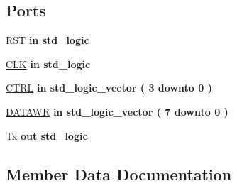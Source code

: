 \subsection*{Ports}
 \begin{DoxyCompactItemize}
\item 
\hyperlink{class_right_shft_a98682ef7de2714e5bab788a2e2ff1b7f}{R\+S\+T}  {\bfseries {\bfseries \textcolor{keywordflow}{in}\textcolor{vhdlchar}{ }}} {\bfseries \textcolor{comment}{std\+\_\+logic}\textcolor{vhdlchar}{ }} 
\item 
\hyperlink{class_right_shft_ab5d0ea9e968d49d94da9db07a979d402}{C\+L\+K}  {\bfseries {\bfseries \textcolor{keywordflow}{in}\textcolor{vhdlchar}{ }}} {\bfseries \textcolor{comment}{std\+\_\+logic}\textcolor{vhdlchar}{ }} 
\item 
\hyperlink{class_right_shft_a391405efff6be710026e84afd96734c7}{C\+T\+R\+L}  {\bfseries {\bfseries \textcolor{keywordflow}{in}\textcolor{vhdlchar}{ }}} {\bfseries \textcolor{comment}{std\+\_\+logic\+\_\+vector}\textcolor{vhdlchar}{ }\textcolor{vhdlchar}{(}\textcolor{vhdlchar}{ }\textcolor{vhdlchar}{ } \textcolor{vhdldigit}{3} \textcolor{vhdlchar}{ }\textcolor{keywordflow}{downto}\textcolor{vhdlchar}{ }\textcolor{vhdlchar}{ } \textcolor{vhdldigit}{0} \textcolor{vhdlchar}{ }\textcolor{vhdlchar}{)}\textcolor{vhdlchar}{ }} 
\item 
\hyperlink{class_right_shft_a7671d0cfbe49b836aa8bfd98c0477dfa}{D\+A\+T\+A\+W\+R}  {\bfseries {\bfseries \textcolor{keywordflow}{in}\textcolor{vhdlchar}{ }}} {\bfseries \textcolor{comment}{std\+\_\+logic\+\_\+vector}\textcolor{vhdlchar}{ }\textcolor{vhdlchar}{(}\textcolor{vhdlchar}{ }\textcolor{vhdlchar}{ } \textcolor{vhdldigit}{7} \textcolor{vhdlchar}{ }\textcolor{keywordflow}{downto}\textcolor{vhdlchar}{ }\textcolor{vhdlchar}{ } \textcolor{vhdldigit}{0} \textcolor{vhdlchar}{ }\textcolor{vhdlchar}{)}\textcolor{vhdlchar}{ }} 
\item 
\hyperlink{class_right_shft_a447d59a050c4bcc20d40ab5c940b17dd}{Tx}  {\bfseries {\bfseries \textcolor{keywordflow}{out}\textcolor{vhdlchar}{ }}} {\bfseries \textcolor{comment}{std\+\_\+logic}\textcolor{vhdlchar}{ }} 
\end{DoxyCompactItemize}


\subsection{Member Data Documentation}
\hypertarget{class_right_shft_ab5d0ea9e968d49d94da9db07a979d402}{}
